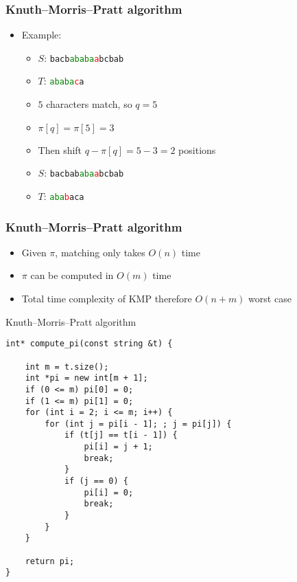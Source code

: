 \documentclass[12pt,t]{beamer}
\begin{document}
\begin{frame}
    \frametitle{Knuth--Morris--Pratt algorithm}
    \vspace{30pt}
    \begin{itemize}
        \item Example:
        \begin{itemize}
            \item $S$: \texttt{bacb\textcolor{green}{ababa}\textcolor{red}{a}bcbab}
            \item $T$: \texttt{\textcolor{green}{ababa}\textcolor{red}{c}a}
            \item<2-> $5$ characters match, so $q = 5$
            \item<3-> $\pi[q] = \pi[5] = 3$
            \item<4-> Then shift $q - \pi[q] = 5 - 3 = 2$ positions
            \item<5-> $S$: \texttt{bacbab\textcolor{green}{aba}\textcolor{red}{a}bcbab}
            \item<5-> $T$: \texttt{\textcolor{green}{aba}\textcolor{red}{b}aca}
        \end{itemize}
    \end{itemize}
\end{frame}

\begin{frame}
    \frametitle{Knuth--Morris--Pratt algorithm}
    \vspace{40pt}
    \begin{itemize}
        \item Given $\pi$, matching only takes $O(n)$ time
        \item $\pi$ can be computed in $O(m)$ time
        \item Total time complexity of KMP therefore $O(n+m)$ worst case
    \end{itemize}
\end{frame}

\begin{frame}[fragile]{Knuth--Morris--Pratt algorithm}
    \begin{verbatim}
int* compute_pi(const string &t) {

    int m = t.size();
    int *pi = new int[m + 1];
    if (0 <= m) pi[0] = 0;
    if (1 <= m) pi[1] = 0;
    for (int i = 2; i <= m; i++) {
        for (int j = pi[i - 1]; ; j = pi[j]) {
            if (t[j] == t[i - 1]) {
                pi[i] = j + 1;
                break;
            }
            if (j == 0) {
                pi[i] = 0;
                break;
            }
        }
    }

    return pi;
}
    \end{verbatim}
\end{frame}
\end{document}
